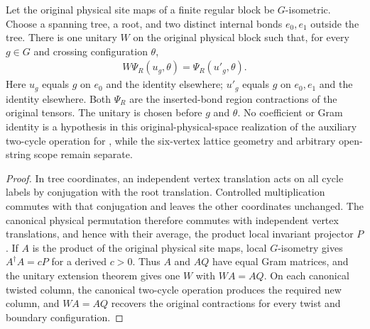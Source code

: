 \begin{lemma}%
    \label{thm:peps_regular_two_cycle_physical_flux_move}
    \leanok
    Let the original physical site maps of a finite regular block be
    $G$-isometric. Choose a spanning tree, a root, and two distinct internal
    bonds $e_0,e_1$ outside the tree. There is one unitary $W$ on the original
    physical block such that, for every $g\in G$ and crossing configuration $\theta$,
    \begin{align}
        W\Psi_R(u_g,\theta)=\Psi_R(u'_g,\theta).
    \end{align}
    Here $u_g$ equals $g$ on $e_0$ and the identity elsewhere;
    $u'_g$ equals $g$ on $e_0,e_1$ and the identity elsewhere.
    Both $\Psi_R$ are the inserted-bond region contractions of the
    original tensors. The unitary is chosen before $g$ and $\theta$.
    No coefficient or Gram identity is a hypothesis in this
    original-physical-space realization of the auxiliary two-cycle
    operation for \cite[Theorem~6.16]{Schuch2010PEPS}, while the six-vertex
    lattice geometry and arbitrary open-string scope remain separate.
\end{lemma}

\begin{proof}\leanok
    In tree coordinates, an independent vertex translation acts on all cycle
    labels by conjugation with the root translation. Controlled multiplication
    commutes with that conjugation and leaves the other coordinates unchanged.
    The canonical physical permutation therefore commutes with independent
    vertex translations, and hence with their average, the product local
    invariant projector $P$.
    If $A$ is the product of the original physical site maps, local
    $G$-isometry gives $A^\dagger A=cP$ for a derived $c>0$.
    Thus $A$ and $AQ$ have equal Gram matrices, and the unitary extension
    theorem gives one $W$ with $WA=AQ$.
    On each canonical twisted column, the canonical two-cycle operation
    produces the required new column, and $WA=AQ$ recovers the original
    contractions for every twist and boundary configuration.
\end{proof}
